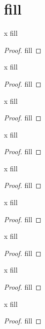 \section{fill}


\begin{exercise}{x}
fill
\end{exercise}
\begin{proof}
fill
\end{proof} 

\begin{exercise}{x}
fill
\end{exercise}
\begin{proof}
fill
\end{proof} 

\begin{exercise}{x}
fill
\end{exercise}
\begin{proof}
fill
\end{proof} 

\begin{exercise}{x}
fill
\end{exercise}
\begin{proof}
fill
\end{proof} 

\begin{exercise}{x}
fill
\end{exercise}
\begin{proof}
fill
\end{proof} 

\begin{exercise}{x}
fill
\end{exercise}
\begin{proof}
fill
\end{proof} 

\begin{exercise}{x}
fill
\end{exercise}
\begin{proof}
fill
\end{proof} 

\begin{exercise}{x}
fill
\end{exercise}
\begin{proof}
fill
\end{proof} 

\begin{exercise}{x}
fill
\end{exercise}
\begin{proof}
fill
\end{proof} 

